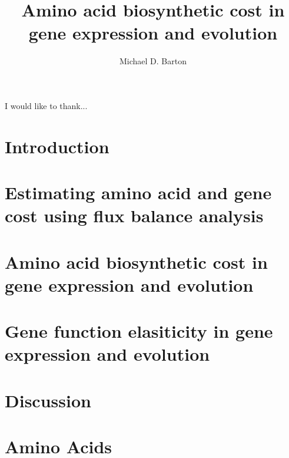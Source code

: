 \documentclass[12pt,PhD]{muthesis}
\begin{document}
\title{Amino acid biosynthetic cost in gene expression and evolution}
\author{Michael D. Barton}

\beforeabstract

\printnomenclature[1.5cm]


\afterabstract

I would like to thank...
\afterpreface

\chapter{Introduction}

\chapter{Estimating amino acid and gene cost using flux balance analysis}

\chapter{Amino acid biosynthetic cost in gene expression and evolution}

\chapter{Gene function elasiticity in gene expression and evolution}

\chapter{Discussion}





\appendix
\addappheadtotoc
\appendixpage
\chapter{Amino Acids}

\end{document}
